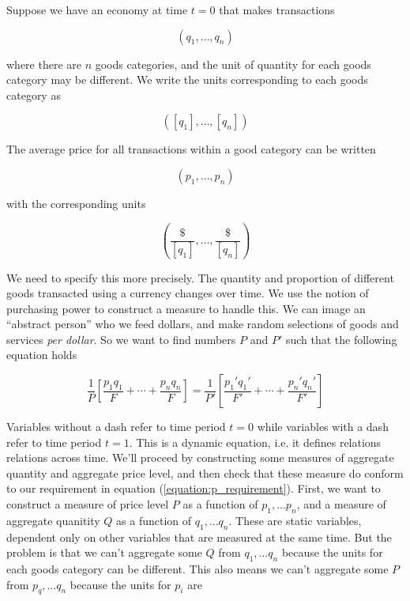 Suppose we have an economy at time $t=0$ that makes transactions 

\[
    \left( q_1, \dots, q_n \right)
\]

where there are $n$ goods categories, and the unit of quantity for each goods category may be
different. We write the units corresponding to each goods category as

\[
    \left( \left[ q_1 \right], \dots, \left[ q_n \right] \right)
\]

The average price for all transactions within a good category can be written

\[ 
    \left( p_1, \dots, p_n \right)
\]

with the corresponding units

\[
    \left( \frac {\$} {\left[ q_1 \right]}, \dots, \frac {\$} {\left[ q_n \right]} \right)
\]






We need to specify this more precisely. The quantity and proportion of different goods
transacted using a currency changes over time. We use the notion of purchasing power to construct a
measure to handle this. We can image an ``abstract person'' who we feed dollars, and make random
selections of goods and services \textit{per dollar}.  So we want to find numbers $P$ and $P'$ such
that the following
equation holds

\begin{equation}\label{equation:p_requirement}
    \frac 1 P \left[ \frac {p_1 q_1} F + \cdots + \frac {p_n q_n} F \right]
    = \frac 1 {P'} \left[ \frac {p_1' q_1'} {F'} + \cdots + \frac {p_n' q_n'} {F'} \right]
\end{equation}

Variables without a dash refer to time period $t=0$ while variables with a dash refer to time period
$t=1$. This is a dynamic equation, i.e. it defines relations relations across time. We'll proceed by
constructing some measures of aggregate quantity and aggregate price level, and then check that
these measure do conform to our requirement in equation (\ref{equation:p_requirement}). First, we
want to construct a measure of price level $P$ as a function of $p_1, \dots p_n$, and a measure of
aggregate quanitity $Q$ as a function of $q_1, \dots q_n$. These are static variables, dependent
only on other variables that are measured at the same time. But the problem is that we can't
aggregate some $Q$ from $q_1, \dots q_n$ because the units for each goods category can be different.
This also means we can't aggregate some $P$ from $p_q, \dots q_n$ because the units for $p_i$ are

